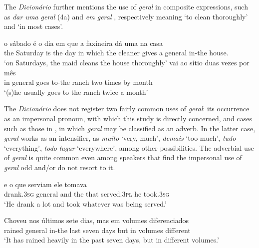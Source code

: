 \documentclass[output=paper]{langscibook}
\begin{document}
The \textit{Dicionário} further mentions the use of \textit{geral} in composite expressions, such as \textit{dar uma geral} (4a) and \textit{em geral} , respectively meaning ‘to clean thoroughly’ and ‘in most cases’.

\ea\label{ex:avelar:4}
 \ea\label{ex:avelar:4a}
  \gll o sábado     é   o dia     em que   a faxineira dá     uma  na casa\\
         the Saturday   is   the day   in which   the cleaner gives   a general in-the   house.\\
  \glt ‘on Saturdays, the maid cleans the house thoroughly’
 \ex\label{ex:avelar:4b} 
    vai   ao sítio     duas   vezes   por mês\\
         {in general  goes   to-the ranch   two   times   by month}\\
  \glt  ‘(s)he usually goes to the ranch twice a month’
\z 
\z

The \textit{Dicionário} does not register two fairly common uses of \textit{geral}: its occurrence as an impersonal pronoun, with which this study is directly concerned, and cases such as those in , in which \textit{geral} may be classified as an adverb. In the latter case, \textit{geral} {works as an intensifier, as} {\textit{muito}} {‘very, much’,} {\textit{demais}} {‘too much’,} {\textit{tudo}} {‘everything’,} {\textit{todo lugar}} {‘everywhere’, among other possibilities. The adverbial use of} \textit{geral} {is quite common even among speakers that find the impersonal use of} \textit{geral} {odd and/or do not resort to it.}

\ea\label{ex:avelar:5}
 \ea\label{ex:avelar:5a} 
    e     o   que   serviam     ele  tomava %
\\
         drank.\textsc{3sg} general   and   the  that   served.\textsc{3pl} he   took.\textsc{3sg}\\
  \glt ‘He drank a lot and took whatever was being served.’

 \ex\label{ex:avelar:5b} 
  \gll Choveu  nos   últimos  sete   dias, mas   em volumes   diferenciados\\
         rained     general   in-the   last     seven   days but   in   volumes   different\\
    \glt ‘It has rained heavily in the past seven days, but in different volumes.’
\end{document}
